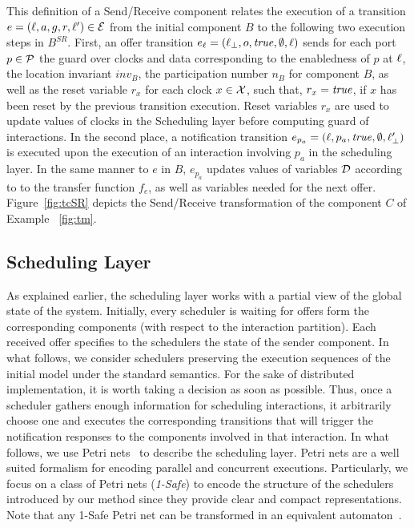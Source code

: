 This definition of a Send/Receive component relates the execution of a transition 
$e=(\ell,a,g,r,\ell')\in\mathcal{E}$ from the initial component $B$ to the following two 
execution steps in $B^{SR}$. First, an offer transition $e_{\ell}=(\ell_{\perp},o,\textnormal{\textit{true}},\emptyset,\ell)$
sends for each port $p\in\mathcal{P}$ the guard over clocks and data corresponding to the enabledness
of $p$ at $\ell$, the location invariant $inv_B$, the participation number $n_B$ for
component $B$, as well as the reset variable $r_x$ for each clock $x\in\mathcal{X}$, such that,
$r_x=\textnormal{\textit{true}}$, if $x$ has been reset by the previous transition execution. Reset variables
$r_x$ are used to update values of clocks in the Scheduling layer before computing guard of 
interactions.
In the second place, a notification transition $e_{p_a}=(\ell,p_a,\textnormal{\textit{true}},\emptyset,\ell_{\perp}')$  
is executed upon the execution of an interaction involving $p_a$ in the scheduling layer. 
In the same manner to $e$ in $B$, $e_{p_a}$ updates values of variables $\mathcal{D}$ according to
to the transfer function $f_e$, as well as variables needed for the next offer. 
Figure~\ref{fig:tcSR} depicts the Send/Receive transformation of the component $C$ of Example
~\ref{fig:tm}.

\subsection{Scheduling Layer}
As explained earlier, the scheduling layer works with a partial view of the global state of 
the system. Initially, every scheduler is waiting for offers form the corresponding components
(with respect to the interaction partition). Each received offer specifies to the schedulers
the state of the sender component. In what follows, we consider schedulers preserving the 
execution sequences of the initial model under
the standard semantics. For the sake of distributed implementation, it is
worth taking a decision as soon as possible. Thus, once a scheduler gathers enough information 
for scheduling interactions, it arbitrarily choose one and executes the corresponding 
transitions that will trigger the notification responses to the components involved in 
that interaction.
In what follows, we use Petri nets~\cite{petri} to describe the scheduling layer. 
Petri nets are a well suited formalism for encoding parallel and concurrent executions. 
Particularly, we focus on a class of Petri nets (\emph{1-Safe}) to encode the structure of 
the schedulers introduced by our method since they provide clear and compact representations. 
Note that any 1-Safe Petri net can be 
transformed in an equivalent automaton~\cite{petri2}. 

